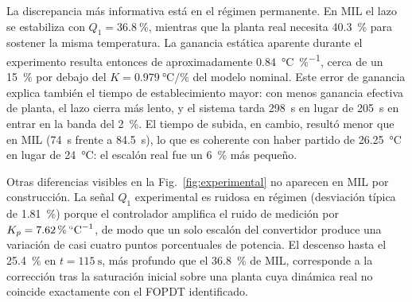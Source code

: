 La discrepancia más informativa está en el régimen permanente. En MIL el lazo se estabiliza con
$Q_1 = \SI{36.8}{\percent}$, mientras que la planta real necesita \SI{40.3}{\percent} para sostener
la misma temperatura. La ganancia estática aparente durante el experimento resulta entonces de
aproximadamente \SI{0.84}{\celsius\per\percent}, cerca de un \SI{15}{\percent} por debajo del
$K = \SI{0.979}{\celsius\per\percent}$ del modelo nominal. Este error de ganancia explica también el
tiempo de establecimiento mayor: con menos ganancia efectiva de planta, el lazo cierra más lento,
y el sistema tarda \SI{298}{\second} en lugar de \SI{205}{\second} en entrar en la banda del
\SI{2}{\percent}. El tiempo de subida, en cambio, resultó menor que en MIL (\SI{74}{\second} frente
a \SI{84.5}{\second}), lo que es coherente con haber partido de \SI{26.25}{\celsius} en lugar de
\SI{24}{\celsius}: el escalón real fue un \SI{6}{\percent} más pequeño.

Otras diferencias visibles en la Fig.~\ref{fig:experimental} no aparecen en MIL por construcción.
La señal $Q_1$ experimental es ruidosa en régimen (desviación típica de \SI{1.81}{\percent}) porque
el controlador amplifica el ruido de medición por $K_p = \SI{7.62}{\percent\per\celsius}$, de modo
que un solo escalón del convertidor produce una variación de casi cuatro puntos porcentuales de
potencia. El descenso hasta el \SI{25.4}{\percent} en $t = \SI{115}{\second}$, más
profundo que el \SI{36.8}{\percent} de MIL, corresponde a la corrección tras la saturación inicial
sobre una planta cuya dinámica real no coincide exactamente con el FOPDT identificado.

